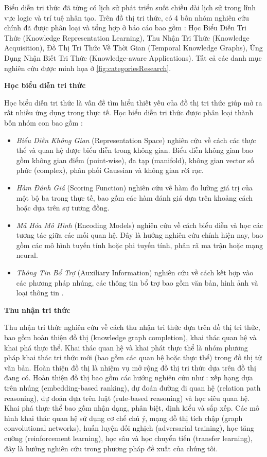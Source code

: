 Biểu diễn tri thức đã từng có lịch sử phát triển suốt chiều dài lịch sử trong lĩnh vực logic và trí tuệ nhân tạo. Trên đồ thị tri thức, có 4 bốn nhóm nghiên cứu chính đã được phân loại và tổng hợp ở báo cáo \cite{ji2020survey} bao gồm : Học Biểu Diễn Tri Thức (Knowledge Representation Learning), Thu Nhận Tri Thức (Knowledge Acquisition), Đồ Thị Tri Thức Về Thời Gian (Temporal Knowledge Graphs), Ứng Dụng Nhận Biết Tri Thức (Knowledge-aware Applications). Tất cả các danh mục nghiên cứu được minh họa ở \autoref{fig:categoriesResearch}.

\textbf{Học biểu diễn tri thức}

Học biểu diễn tri thức là vấn đề tìm hiểu thiết yếu của đồ thị tri thức giúp mở ra rất nhiều ứng dụng trong thực tế. Học biểu diễn tri thức được phân loại thành bốn nhóm con bao gồm : 

\begin{itemize}
	\item \textit{Biểu Diễn Không Gian} (Representation Space) nghiên cứu về cách các thực thể và quan hệ được biểu diễn trong không gian. Biểu diễn không gian bao gồm không gian điểm (point-wise), đa tạp (manifold), không gian vector số phức (complex), phân phối Gaussian và không gian rời rạc.
	
	\item \textit{Hàm Đánh Giá} (Scoring Function) nghiên cứu về hàm đo lường giá trị của một bộ ba trong thực tế, bao gồm các hàm đánh giá dựa trên khoảng cách hoặc dựa trên sự tương đồng.
	
	\item \textit{Mã Hóa Mô Hình} (Encoding Models) nghiên cứu về cách biểu diễn và học các tương tác giữa các mối quan hệ. Đây là hướng nghiên cứu chính hiện nay, bao gồm các mô hình tuyến tính hoặc phi tuyến tính, phân rã ma trận hoặc mạng neural.
	
	\item \textit{Thông Tin Bổ Trợ} (Auxiliary Information) nghiên cứu về cách kết hợp vào các phương pháp nhúng, các thông tin bổ trợ bao gồm văn bản, hình ảnh và loại thông tin .
\end{itemize}

\textbf{Thu nhận tri thức}

Thu nhận tri thức nghiên cứu về cách thu nhận tri thức dựa trên đồ thị tri thức, bao gồm hoàn thiện đồ thị (knowledge graph completion), khai thác quan hệ và khai phá thực thể. Khai thác quan hệ và khai phát thực thể là nhóm phương pháp khai thác tri thức mới (bao gồm các quan hệ hoặc thực thể) trong đồ thị từ văn bản. Hoàn thiện đồ thị là nhiệm vụ mở rộng đồ thị tri thức dựa trên đồ thị đang có. Hoàn thiện đồ thị bao gồm các hướng nghiên cứu như : xếp hạng dựa trên nhúng (embedding-based ranking), dự đoán đường đi quan hệ (relation path reasoning), dự đoán dựa trên luật (rule-based reasoning) và học siêu quan hệ.
Khai phá thực thể bao gồm nhận dạng, phân biệt, định kiểu và sắp xếp. 
Các mô hình khai thác quan hệ sử dụng cơ chế chú ý, mạng đồ thị tích chập (graph
convolutional networks), huấn luyện đối nghịch (adversarial training), học tăng cường (reinforcement learning), học sâu và học chuyển tiến (transfer learning), đây là hướng nghiên cứu trong phương pháp đề xuất của chúng tôi.

